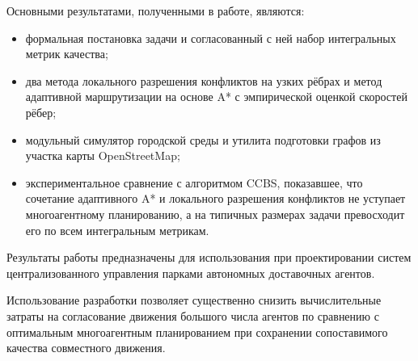 Основными результатами, полученными в работе, являются:
\begin{itemize}
\item формальная постановка задачи и согласованный с ней набор интегральных
      метрик качества;
\item два метода локального разрешения конфликтов на узких рёбрах и метод адаптивной
      маршрутизации на основе A* с эмпирической оценкой скоростей рёбер;
\item модульный симулятор городской среды и утилита подготовки графов из
      участка карты OpenStreetMap;
\item экспериментальное сравнение с алгоритмом CCBS, показавшее, что сочетание
      адаптивного A* и локального разрешения конфликтов не уступает
      многоагентному планированию, а на типичных размерах задачи превосходит
      его по всем интегральным метрикам.
\end{itemize}

Результаты работы предназначены для использования при проектировании систем
централизованного управления парками автономных доставочных агентов.

Использование разработки позволяет существенно снизить вычислительные затраты
на согласование движения большого числа агентов по сравнению с оптимальным
многоагентным планированием при сохранении сопоставимого качества совместного
движения.
